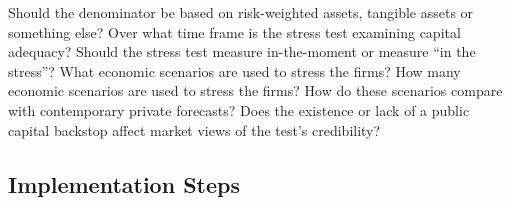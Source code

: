 \documentclass[justified, nobib]{tufte-handout2}
\begin{document}
\begin{outline}[enumerate]
\4 Should the denominator be based on risk-weighted assets, tangible assets or something else?
\3 Over what time frame is the stress test examining capital adequacy?
\2 Should the stress test measure in-the-moment or measure ``in the stress''?
\2 What economic scenarios are used to stress the firms?
\3 How many economic scenarios are used to stress the firms?
\3 How do these scenarios compare with contemporary private forecasts?
\2 Does the existence or lack of a public capital backstop affect market views of the test's credibility?

\end{outline}

\subsection{Implementation Steps}
\end{document}
